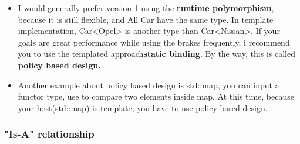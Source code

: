 \documentclass[a4paper,11pt,twoside]{book}
\begin{document}
\begin{itemize}
	\item I would generally prefer version 1 using the \textbf{runtime polymorphism}, because it is still flexible, and All Car  have the same type. In template implementation,  Car<Opel> is another type than Car<Nissan>. If your goals are great performance while using the brakes frequently, i recommend you to use the templated approach\textbf{static binding}. By the way, this is called \textbf{policy based design.}
	
	\item Another example about policy based design is std::map, you can input a functor type, use to compare two elements inside map. At this time, because your host(std::map) is template, you have to use policy based design.
\end{itemize}

\subsubsection{"Is-A" relationship}
\end{document}
